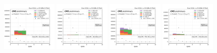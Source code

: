 \begin{figure}
    \includegraphics[width=0.24\textwidth]{appendices/qcdSF/figures/123j1b/mu_nJets_True.png}
    \includegraphics[width=0.24\textwidth]{appendices/qcdSF/figures/123j1b/mu_nJets_False.png}
    \includegraphics[width=0.24\textwidth]{appendices/qcdSF/figures/123j1b/e_nJets_True.png}
    \includegraphics[width=0.24\textwidth]{appendices/qcdSF/figures/123j1b/e_nJets_False.png}
    

\end{figure}

